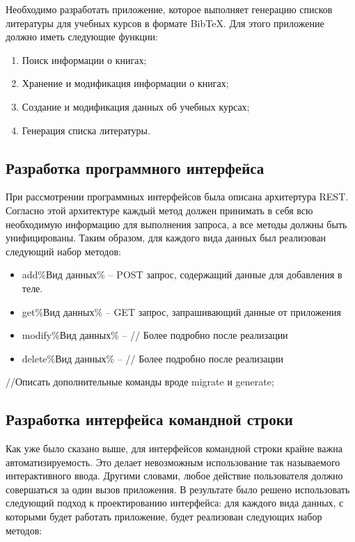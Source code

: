 Необходимо разработать приложение, которое выполняет генерацию списков литературы
для учебных курсов в формате BibTeX. Для этого приложение должно иметь следующие функции:

\begin{enumerate}
    \item Поиск информации о книгах;
    \item Хранение и модификация информации о книгах;
    \item Создание и модификация данных об учебных курсах;
    \item Генерация списка литературы.
\end{enumerate}

\subsection*{Разработка программного интерфейса}

При рассмотрении программных интерфейсов была описана архитертура REST. Согласно
этой архитектуре каждый метод должен принимать в себя всю необходимую информацию
для выполнения запроса, а все методы должны быть унифицированы. Таким образом, для каждого
вида данных был реализован следующий набор методов:

\begin{itemize}
    \item add\%Вид данных\% -- POST запрос, содержащий данные для добавления в теле.
    \item get\%Вид данных\% -- GET запрос, запрашивающий данные от приложения
    \item modify\%Вид данных\% -- // Более подробно после реализации
    \item delete\%Вид данных\% -- // Более подробно после реализации
\end{itemize}

//Описать дополнительные команды вроде migrate и generate;

\subsection*{Разработка интерфейса командной строки}

Как уже было сказано выше, для интерфейсов командной строки крайне важна автоматизируемость.
Это делает невозможным использование так называемого интерактивного ввода. Другими словами,
любое действие пользователя должно совершаться за один вызов приложения. В результате
было решено использовать следующий подход к проектированию интерфейса: для каждого вида данных,
с которыми будет работать приложение, будет реализован следующих набор методов:

